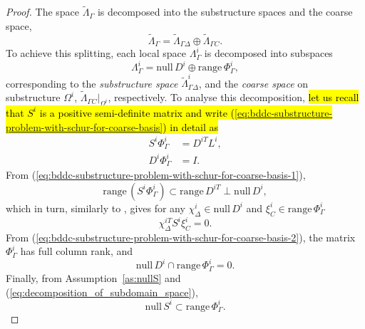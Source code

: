 \begin{proof} 

The space $\widetilde{\Lambda}_{\Gamma}$ is decomposed into the substructure spaces and the coarse space,
\begin{equation}
\widetilde{\Lambda}_{\Gamma} = \widetilde{\Lambda}_{\Gamma\Delta} \oplus \widetilde{\Lambda}_{\Gamma C}.
\end{equation}
To achieve this splitting, each local space ${\Lambda}_{\Gamma}^{i}$ is decomposed into subspaces
\begin{equation}
{\Lambda}_{\Gamma}^{i} = \mathrm{null}\,D^{i} \oplus \mathrm{range}\,\Phi_{\Gamma}^{i},
\label{eq:decomposition_of_subdomain_space}
\end{equation}
corresponding to the \emph{substructure space} $\widetilde{\Lambda}_{\Gamma\Delta}^{i}$, 
and the \emph{coarse space} on substructure $\Omega^{i}$, $\widetilde{\Lambda}_{\Gamma C}|_{\Omega^{i}}$, respectively.
To analyse this decomposition, 
\hl{let us recall that $S^{i}$ is a positive semi-definite matrix and write
(\ref{eq:bddc-substructure-problem-with-schur-for-coarse-basis}) in detail as}
\begin{align}
\label{eq:bddc-substructure-problem-with-schur-for-coarse-basis-1}%
S^{i}\Phi_{\Gamma}^{i} & = D^{iT} L^{i}, \\
\label{eq:bddc-substructure-problem-with-schur-for-coarse-basis-2}%
D^{i} \Phi_{\Gamma}^{i}& = I.
\end{align}
From (\ref{eq:bddc-substructure-problem-with-schur-for-coarse-basis-1}),
\begin{equation}
\mathrm{range}\,(S^{i} \Phi_{\Gamma}^{i}) \subset \mathrm{range}\,D^{iT} \perp \mathrm{null}\,D^{i},
\label{eq:S-orthogonality}
\end{equation}
which in turn, similarly to \cite[Lemma~8]{Mandel-2005-ATP}, 
gives for any $\chi^{i}_{\Delta} \in \mathrm{null}\,D^{i}$ and $\xi^{i}_{C} \in \mathrm{range}\,\Phi_{\Gamma}^{i}$
\begin{equation}
\label{eq:S-orthogonality2}
\chi^{iT}_{\Delta} S^{i} \xi^{i}_{C} = 0.
\end{equation}
From (\ref{eq:bddc-substructure-problem-with-schur-for-coarse-basis-2}),
the matrix $\Phi_{\Gamma}^{i}$ has full column rank,
and 
\begin{equation}
\mathrm{null}\,D^{i} \cap \mathrm{range}\,\Phi_{\Gamma}^{i} = {0}.
\end{equation}
Finally, from Assumption~\ref{as:nullS} and (\ref{eq:decomposition_of_subdomain_space}), 
\begin{equation}
\mathrm{null}\,S^{i} \subset \mathrm{range}\,\Phi_{\Gamma}^{i}.
\end{equation}



\end{proof}
